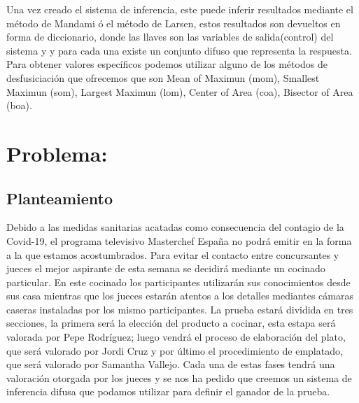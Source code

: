 \documentclass[12pt]{article}
\begin{document}
Una vez creado el sistema de inferencia, este puede inferir resultados mediante el m\'etodo de Mandami \'o el m\'etodo de Larsen, estos resultados son devueltos
en forma de diccionario, donde las llaves son las variables de salida(control) del sistema y y para cada una existe un conjunto difuso que representa la respuesta.
Para obtener valores espec\'ificos podemos utilizar alguno de los m\'etodos de desfusiciaci\'on que ofrecemos que son Mean of Maximun (mom), Smallest Maximun (som),
Largest Maximun (lom), Center of Area (coa), Bisector of Area (boa).

\section{Problema:}
\subsection{Planteamiento}
Debido a las medidas sanitarias acatadas como consecuencia del contagio de la Covid-19, el programa televisivo Masterchef Espa\~na no podr\'a emitir en la forma a la que estamos
acostumbrados. Para evitar el contacto entre concursantes y jueces el mejor aspirante de esta semana se decidir\'a mediante un cocinado particular. En este cocinado los participantes
utilizar\'an sus conocimientos desde sus casa mientras que los jueces estar\'an atentos a los detalles mediantes c\'amaras caseras instaladas por los mismo participantes. La prueba estar\'a dividida
en tres secciones, la primera ser\'a la elecci\'on del producto a cocinar, esta estapa ser\'a valorada por Pepe Rodr\'iguez; luego vendr\'a el proceso de elaboraci\'on del plato, que ser\'a valorado por Jordi Cruz y por \'ultimo 
el procedimiento de emplatado, que ser\'a valorado por Samantha Vallejo. Cada una de estas fases tendr\'a una valoraci\'on otorgada por los jueces y se nos ha pedido que creemos un sistema de inferencia difusa que podamos utilizar para definir
el ganador de la prueba.
\end{document}
